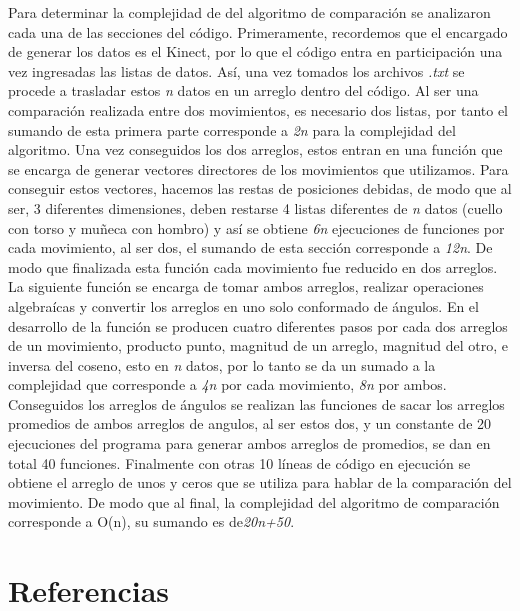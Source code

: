 \documentclass[letterpaper]{article}
\begin{document}
\quad \quad Para determinar la complejidad de del algoritmo de comparación se analizaron cada una de las secciones del código. 
Primeramente, recordemos que el encargado de generar los datos es el Kinect, por lo que el código entra en participación una vez ingresadas las listas de datos.
Así, una vez tomados los archivos \textit{.txt} se procede a trasladar estos \textit{n} datos en un arreglo dentro del código. Al ser una comparación realizada entre dos movimientos, 
es necesario dos listas, por tanto el sumando de esta primera parte corresponde a \textit{2n} para la complejidad del algoritmo. Una vez conseguidos los dos arreglos, estos entran 
en una función que se encarga de generar vectores directores de los movimientos que utilizamos. Para conseguir estos vectores, hacemos las restas de posiciones debidas, de modo que al ser, 3 diferentes dimensiones, deben restarse 4 listas diferentes de \textit{n} datos (cuello con torso y muñeca con hombro)
y así se obtiene \textit{6n} ejecuciones de funciones por cada movimiento, al ser dos, el sumando de esta sección corresponde a \textit{12n}. De modo que finalizada esta función cada movimiento fue reducido en dos arreglos.
La siguiente función se encarga de tomar ambos arreglos, realizar operaciones algebraícas y convertir los arreglos en uno solo conformado de ángulos. En el desarrollo de la función se producen cuatro diferentes pasos por cada dos arreglos de un movimiento, producto punto, magnitud de un arreglo, magnitud del otro, e inversa del coseno, esto en \textit{n} datos, por lo tanto
se da un sumado a la complejidad que corresponde a \textit{4n} por cada movimiento, \textit{8n} por ambos.
Conseguidos los arreglos de ángulos se realizan las funciones de sacar los arreglos promedios de ambos arreglos de angulos, al ser estos dos, y un constante de 20 ejecuciones del programa para generar ambos arreglos de promedios, se dan en total 40 funciones.
Finalmente con otras 10 líneas de código en ejecución se obtiene el arreglo de unos y ceros que se utiliza para hablar de la comparación del movimiento. De modo que al final, la complejidad del algoritmo de comparación corresponde a O(n), su sumando es de\textit{20n+50}.


\section{Referencias}
\end{document}
